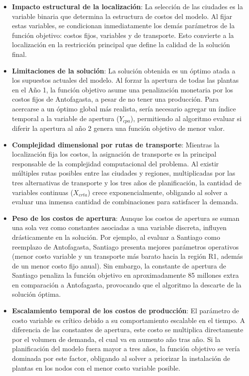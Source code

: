 \documentclass{article}
\begin{document}
\begin{itemize}

    \item \textbf{Impacto estructural de la localización}: La selección de las ciudades es la variable binaria que determina la estructura de costos del modelo. Al fijar estas variables, se condicionan inmediatamente los demás parámetros de la función objetivo: costos fijos, variables y de transporte. Esto convierte a la localización en la restricción principal que define la calidad de la solución final.
    
    \item \textbf{Limitaciones de la solución}: La solución obtenida es un óptimo atada a los supuestos actuales del modelo. Al forzar la apertura de todas las plantas en el Año 1, la función objetivo asume una penalización monetaria por los costos fijos de Antofagasta, a pesar de no tener una producción. Para acercarse a un óptimo global más realista, sería necesario agregar un índice temporal a la variable de apertura ($Y_{cpa}$), permitiendo al algoritmo evaluar si diferir la apertura al año 2 genera una función objetivo de menor valor.

    \item \textbf{Complejidad dimensional por rutas de transporte}: Mientras la localización fija los costos, la asignación de transporte es la principal responsable de la complejidad computacional del problema. Al existir múltiples rutas posibles entre las ciudades y regiones, multiplicadas por las tres alternativas de transporte y los tres años de planificación, la cantidad de variables continuas ($X_{crta}$) crece exponencialmente, obligando al solver a evaluar una inmensa cantidad de combinaciones para satisfacer la demanda.
    
    \item \textbf{Peso de los costos de apertura}: Aunque los costos de apertura se suman una sola vez como constantes asociadas a una variable discreta, influyen drásticamente en la solución. Por ejemplo, al evaluar a Santiago como reemplazo de Antofagasta, Santiago presenta mejores parámetros operativos (menor costo variable y un transporte más barato hacia la región R1, además de un menor costo fijo anual). Sin embargo, la constante de apertura de Santiago penaliza la función objetivo en aproximadamente 85 millones extra en comparación a Antofagasta, provocando que el algoritmo la descarte de la solución óptima.

    \item \textbf{Escalamiento temporal de los costos de producción}: El parámetro de costo variable es crítico debido a su comportamiento escalable en el tiempo. A diferencia de las constantes de apertura, este costo se multiplica directamente por el volumen de demanda, el cual va en aumento año tras año. Si la planificación del modelo fuera mayor a tres años, la función objetivo se vería dominada por este factor, obligando al solver a priorizar la instalación de plantas en los nodos con el menor costo variable posible.
\end{itemize}
\end{document}
